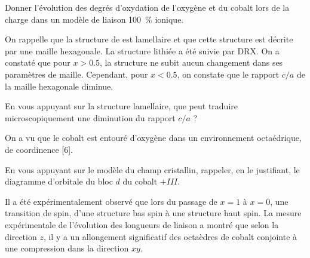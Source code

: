 \Q Donner l'évolution des degrés d'oxydation de l'oxygène et du cobalt lors de la charge dans un modèle de liaison \SI{100}{\percent} ionique.

On rappelle que la structure de  est lamellaire et que cette structure est décrite par une maille hexagonale. La structure lithiée a été suivie par DRX. On a constaté que pour $x > 0.5$, la structure ne subit aucun changement dans ses paramètres de maille. Cependant, pour $x<0.5$, on constate que le rapport $c/a$ de la maille hexagonale diminue.

\Q En vous appuyant sur la structure lamellaire, que peut traduire microscopiquement une diminution du rapport $c/a$ ?

On a vu que le cobalt est entouré d'oxygène dans un environnement octaédrique, de coordinence [6]. 

\Q En vous appuyant sur le modèle du champ cristallin, rappeler, en le justifiant, le diagramme d'orbitale du bloc $d$ du cobalt $+III$.

Il a été expérimentalement observé que lors du passage de $x = 1$ à $x = 0$, une transition de spin, d'une structure bas spin à une structure haut spin. La mesure expérimentale de l'évolution des longueurs de liaison a montré que selon la direction $z$, il y a un allongement significatif des octaèdres de cobalt conjointe à une compression dans la direction $xy$.

